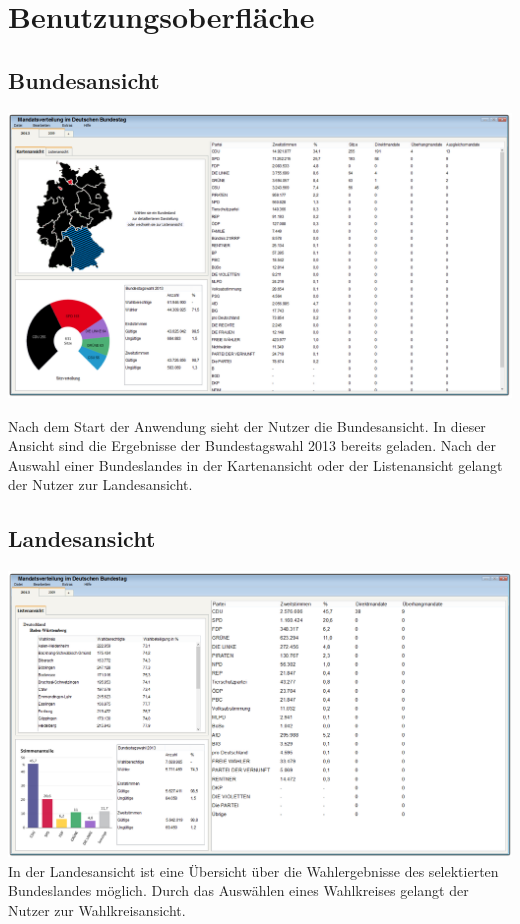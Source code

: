 \documentclass[10pt,a4paper]{article}
\begin{document}
\section{Benutzungsoberfläche}
\subsection{Bundesansicht}
\includegraphics[scale=0.3]{Bundesansicht.png}

\noindent Nach dem Start der Anwendung sieht der Nutzer die Bundesansicht.
In dieser Ansicht sind die Ergebnisse der Bundestagswahl 2013 bereits geladen.
Nach der Auswahl einer Bundeslandes in der Kartenansicht oder der Listenansicht gelangt der Nutzer zur Landesansicht.
\newpage
\subsection{Landesansicht}
\includegraphics[scale=0.3]{Landesansicht.png}
\noindent In der Landesansicht ist eine Übersicht über die Wahlergebnisse des selektierten Bundeslandes möglich. Durch das Auswählen eines Wahlkreises gelangt der Nutzer zur Wahlkreisansicht.
\newpage
\end{document}
